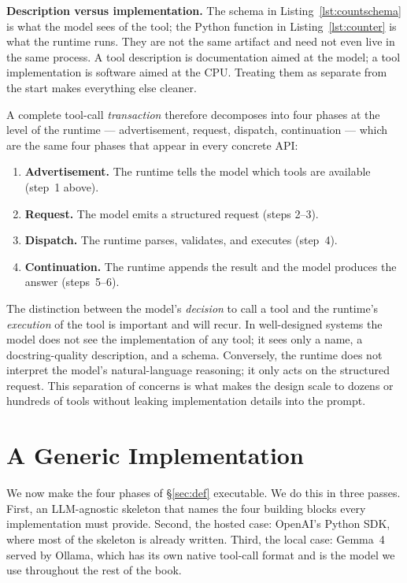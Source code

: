 \begin{remarkbox}
\small
\textbf{Description versus implementation.} The schema in
Listing~\ref{lst:countschema} is what the model sees of the tool;
the Python function in Listing~\ref{lst:counter} is what the runtime
runs. They are not the same artifact and need not even live in the
same process. A tool description is documentation aimed at the
model; a tool implementation is software aimed at the CPU. Treating
them as separate from the start makes everything else cleaner.
\end{remarkbox}

A complete tool-call \emph{transaction} therefore decomposes into
four phases at the level of the runtime --- advertisement, request,
dispatch, continuation --- which are the same four phases that
appear in every concrete API:

\begin{enumerate}[label=(\roman*)]
\item \textbf{Advertisement.} The runtime tells the model which tools
  are available (step~1 above).
\item \textbf{Request.} The model emits a structured request (steps
  2--3).
\item \textbf{Dispatch.} The runtime parses, validates, and executes
  (step~4).
\item \textbf{Continuation.} The runtime appends the result and the
  model produces the answer (steps~5--6).
\end{enumerate}

The distinction between the model's \emph{decision} to call a tool and
the runtime's \emph{execution} of the tool is important and will
recur. In well-designed systems the model does not see the
implementation of any tool; it sees only a name, a docstring-quality
description, and a schema. Conversely, the runtime does not interpret
the model's natural-language reasoning; it only acts on the
structured request. This separation of concerns is what makes the
design scale to dozens or hundreds of tools without leaking
implementation details into the prompt.

\section{A Generic Implementation}
\label{sec:impl}

We now make the four phases of \S\ref{sec:def} executable. We do
this in three passes. First, an LLM-agnostic skeleton that names the
four building blocks every implementation must provide. Second, the
hosted case: OpenAI's Python SDK, where most of the skeleton is
already written. Third, the local case: Gemma~4 served by Ollama,
which has its own native tool-call format and is the model we use
throughout the rest of the book.

